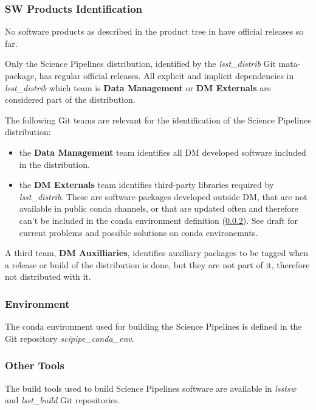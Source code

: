 \subsubsection{SW Products Identification} \label{sec:statusIdentification}

No software products as described in the product tree in  have official releases so far. 

Only the Science Pipelines distribution, identified by the \textit{lsst\_distrib} Git mata-package, has regular official releases.
All explicit and implicit dependencies in \textit{lsst\_distrib} which team is \textbf{Data Management} or \textbf{DM Externals} are considered part of the distribution.

The following Git teams are relevant for the identification of the Science Pipelines distribution:

\begin{itemize}
\item the \textbf{Data Management} team identifies all DM developed software included in the distribution.
\item the \textbf{DM Externals} team identifies third-party libraries required by \textit{lsst\_distrib}.
These are software packages developed outside DM, that are not available in public conda channels, or that are updated often and therefore can't be included in the conda environment definition (\ref{sec:statusEnvs}).
See draft  for current problems and possible solutions on conda environemnts.
\end{itemize}

A third team, \textbf{DM Auxilliaries}, identifies auxiliary packages to be tagged when a release or build of the distribution is done, but they are not part of it, therefore not distributed with it.


\subsubsection{Environment} \label{sec:statusEnvs}

The conda environment used for building the Science Pipelines is defined in the Git repository \textit{scipipe\_conda\_env}.


\subsubsection{Other Tools} \label{sec:statusTools}

The build tools used to build Science Pipelines software are available in \textit{lsstsw} and \textit{lsst\_build} Git repositories.

